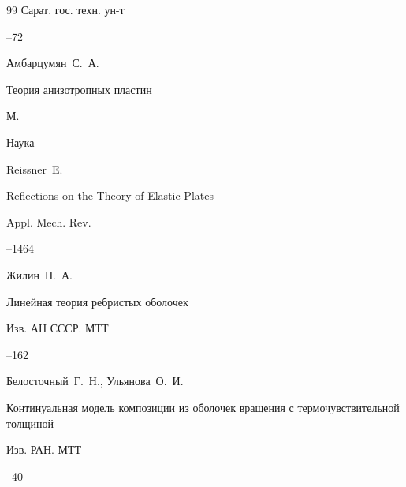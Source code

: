 \begin{thebibliography}{99}
\publ Сарат. гос. техн. ун-т


--72






\by Амбарцумян~С.~А.

\book Теория анизотропных пластин

\publaddr М.

\publ Наука






\by Reissner~E.

\paper 

 Reflections on the Theory of Elastic Plates

\jour Appl. Mech. Rev.



--1464 










\by Жилин~П.~А.

\paper Линейная теория ребристых оболочек

\jour Изв. АН СССР. МТТ



--162




\by Белосточный~Г.~Н., Ульянова~О.~И.

\paper Континуальная модель композиции из оболочек вращения с термочувствительной толщиной

\jour Изв. РАН. МТТ



--40






\end{thebibliography}
